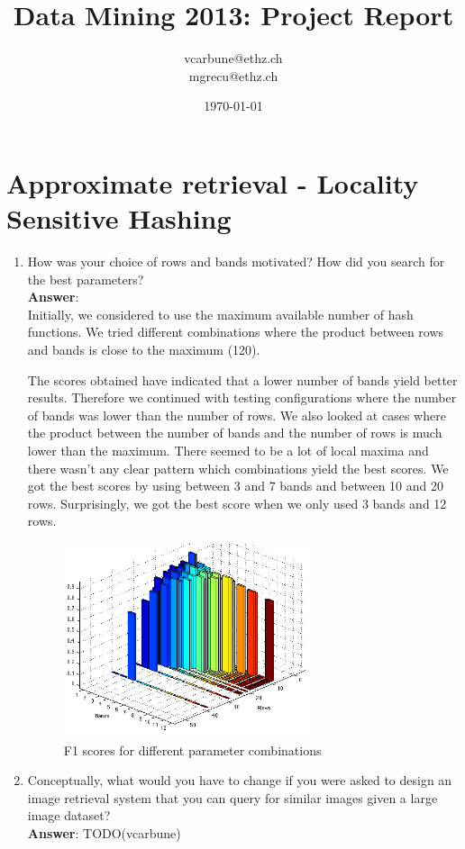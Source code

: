 \documentclass[11pt]{article}
\title{Data Mining 2013: Project Report}
\author{vcarbune@ethz.ch\\ mgrecu@ethz.ch}
\date{\today}
\begin{document}
\maketitle

\section{Approximate retrieval - Locality Sensitive Hashing}
\begin{enumerate}
\item How was your choice of rows and bands motivated? How did you search for the
best parameters? \\

\textbf{Answer}: \\
Initially, we considered to use the maximum available number of
hash functions. We tried different combinations where the product 
between rows and bands is close to the maximum (120).

The scores obtained have indicated that a lower number of bands yield
better results. Therefore we continued with testing configurations where 
the number of bands was lower than the number of rows. 
We also looked at cases where the product between the number of bands and
the number of rows is much lower than the maximum. 
There seemed to be a lot of local maxima and there wasn't any clear pattern 
which combinations yield the best scores. We got the best scores by using
between 3 and 7 bands and between 10 and 20 rows.
Surprisingly, we got the best score when we only used 3 bands and 12 rows.


\begin{figure}[h!b]
\centering
\includegraphics[width=0.7\textwidth]{lsh.png}
\caption{F1 scores for different parameter combinations}
\label{fig:lsh_chart}
\end{figure}


\item Conceptually, what would you have to change if you were asked to design an image
  retrieval system that you can query for similar images given a large image
  dataset? \\

\textbf{Answer}: TODO(vcarbune)

\end{enumerate}
\end{document}
